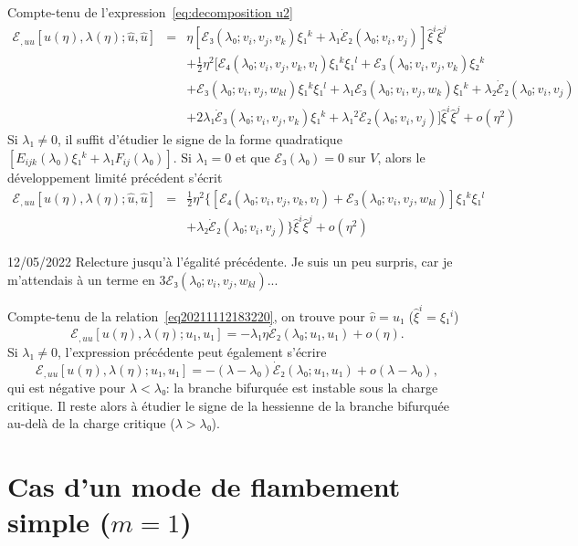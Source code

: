 \documentclass{article}
\newcommand{\textdots}{...}
\begin{document}
Compte-tenu de l'expression~\eqref{eq:decomposition u2}
\begin{eqnarray}
  ℰ_{, u  u} [u (η), λ (η) ; \hat{u}, \hat{u}] &
  = & η [ℰ₃ (λ₀ ; v_i, v_j, v_k) ξ₁^k + λ₁
  \dot{ℰ}₂ (λ₀ ; v_i, v_j)]  \hat{ξ}^i  \hat{ξ}^j
  \nonumber\\
  &  & + \tfrac{1}{2} η^2  [ℰ₄ (λ₀ ; v_i, v_j, v_k, v_l)
  ξ₁^k ξ₁^l +ℰ₃ (λ₀ ; v_i, v_j, v_k) ξ₂^k
   \nonumber\\
  &  & +ℰ₃ (λ₀ ; v_i, v_j, w_{k  l}) ξ₁^k
  ξ₁^l + λ₁ ℰ₃ (λ₀ ; v_i, v_j, w_k) ξ₁^k +
  λ₂  \dot{ℰ}₂ (λ₀ ; v_i, v_j) \nonumber\\
  &  &  + 2 λ₁  \dot{ℰ}₃ (λ₀ ; v_i, v_j,
  v_k) ξ₁^k + λ₁^2  \ddot{ℰ}₂ (λ₀ ; v_i, v_j)]
  \hat{ξ}^i  \hat{ξ}^j + o (η^2) \nonumber
\end{eqnarray}
Si $λ₁ \neq 0$, il suffit d'étudier le signe de la forme
quadratique $[E_{i  j  k} (λ₀) ξ₁^k + λ₁ F_{i
 j} (λ₀)] .$ Si $λ₁ = 0$ et que $ℰ₃
(λ₀) = 0$ sur $V$, alors le développement limité
précédent s'écrit
\begin{eqnarray}
  ℰ_{, u  u} [u (η), λ (η) ; \hat{u}, \hat{u}] &
  = & \tfrac{1}{2} η^2  \{ [ℰ₄ (λ₀ ; v_i, v_j, v_k, v_l)
   +ℰ₃ (λ₀ ; v_i, v_j, w_{k  l})] ξ₁^k
  ξ₁^l \nonumber\\
  &  & +  λ₂  \dot{ℰ}₂ (λ₀ ; v_i, v_j) \}
  \hat{ξ}^i  \hat{ξ}^j + o (η^2) \nonumber
\end{eqnarray}
\begin{tmframed}
  12/05/2022 Relecture jusqu'à l'égalité précédente. Je
  suis un peu surpris, car je m'attendais à un terme en $3ℰ₃
  (λ₀ ; v_i, v_j, w_{k  l})${\textdots}
\end{tmframed}

Compte-tenu de la relation~\eqref{eq20211112183220}, on trouve pour $\hat{v} =
u₁$ ($\hat{ξ}^i = ξ₁^i$)
\begin{equation}
  ℰ_{, u  u} [u (η), λ (η) ; u₁, u₁] = -
  λ₁ η \dot{ℰ}₂ (λ₀ ; u₁, u₁) + o (η) .
\end{equation}
Si $λ₁ \neq 0$, l'expression précédente peut également
s'écrire
\begin{equation}
  ℰ_{, u  u} [u (η), λ (η) ; u₁, u₁] = -
  (λ - λ₀)  \dot{ℰ}₂ (λ₀ ; u₁, u₁) + o
  (λ - λ₀),
\end{equation}
qui est négative pour $λ < λ₀$: la branche bifurquée est
instable sous la charge critique. Il reste alors à étudier le signe de
la hessienne de la branche bifurquée au-delà de la charge critique
($λ > λ₀$).

\section{Cas d'un mode de flambement simple ($m = 1$)}
\end{document}
